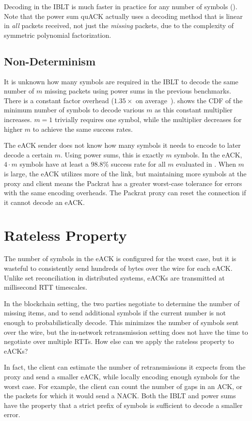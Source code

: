 Decoding in the IBLT is much faster in practice for any number of symbols
(). Note that the power sum quACK actually uses a decoding
method that is linear in \textit{all} packets received, not just the \textit
{missing} packets, due to the complexity of symmetric polynomial
factorization.

\subsection{Non-Determinism}




It is unknown how many symbols are required in the IBLT to decode the same
number of $m$ missing packets using power sums in the previous benchmarks.
There is a constant factor overhead ($1.35\times$ on average~\cite
{yang2024practical}).
 shows the CDF of the minimum number of symbols to decode
various $m$ as this constant multiplier increases. $m=1$ trivially requires
one symbol, while the multiplier decreases for higher $m$ to achieve the same
success rates.

The eACK sender does not know how many symbols it needs to encode to later
decode a certain $m$. Using power sums, this is exactly $m$ symbols. In
the eACK, $4 \cdot m$ symbols have at least a $\!98.8\%$ success rate for
all $m$ evaluated in . When $m$ is large, the eACK utilizes more
of the link, but maintaining more symbols at the proxy and client means
the Packrat has a greater worst-case tolerance for errors with the same encoding
overheads. The Packrat proxy can reset the connection if it cannot decode an eACK.

\section{Rateless Property}

The number of symbols in the eACK is configured for the worst case, but it is
wasteful to consistently send hundreds of bytes over the wire for each eACK.
Unlike set reconciliation in distributed systems, eACKs are transmitted at
millisecond RTT timescales.

In the blockchain setting, the two parties negotiate to determine the number of
missing items, and to send additional symbols if the current number is not
enough to probabilistically decode. This minimizes the number of symbols sent
over the wire, but the in-network retransmission setting does not have the time
to negotiate over multiple RTTs. How else can we apply the rateless property to
eACKs?

In fact, the client can estimate the number of retransmissions it expects from
the proxy and send a smaller eACK, while locally encoding enough symbols for
the worst case. For example, the client can count the number of gaps in an ACK,
or the packets for which it would send a NACK. Both the IBLT and power sums
have the property that a strict prefix of symbols is sufficient to decode a
smaller error.
